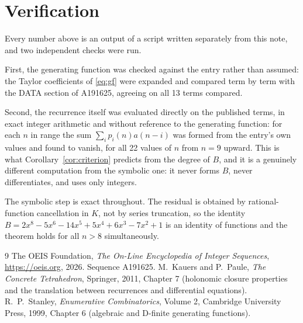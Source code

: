 \documentclass[11pt,a4paper]{article}
\theoremstyle{plain}
\theoremstyle{definition}
\begin{document}
\section{Verification}

Every number above is an output of a script written separately from this note, and two
independent checks were run.

First, the generating function was checked against the entry rather than assumed: the
Taylor coefficients of \eqref{eq:gf} were expanded and compared term by term with the DATA
section of A191625, agreeing on all 13 terms compared.

Second, the recurrence itself was evaluated directly on the published terms, in exact
integer arithmetic and without reference to the generating function: for each $n$ in range
the sum $\sum_{i}p_{i}(n)a(n-i)$ was formed from the entry's own values and found to
vanish, for all 22 values of $n$ from $n=9$ upward. This is what
Corollary~\ref{cor:criterion} predicts from the degree of $B$, and it is a genuinely
different computation from the symbolic one: it never forms $B$, never differentiates, and
uses only integers.

The symbolic step is exact throughout. The residual is obtained by rational-function
cancellation in $K$, not by series truncation, so the identity $B=2 x^{8} - 5 x^{6} - 14 x^{5} + 5 x^{4} + 6 x^{3} - 7 x^{2} + 1$ is an
identity of functions and the theorem holds for all $n>8$ simultaneously.

\begin{thebibliography}{9}
 The OEIS Foundation, \emph{The On-Line Encyclopedia of Integer Sequences},
\url{https://oeis.org}, 2026. Sequence A191625.
 M.~Kauers and P.~Paule, \emph{The Concrete Tetrahedron}, Springer, 2011,
Chapter 7 (holonomic closure properties and the translation between recurrences and
differential equations).
 R.~P.~Stanley, \emph{Enumerative Combinatorics}, Volume 2, Cambridge
University Press, 1999, Chapter 6 (algebraic and D-finite generating functions).
\end{thebibliography}
\end{document}
